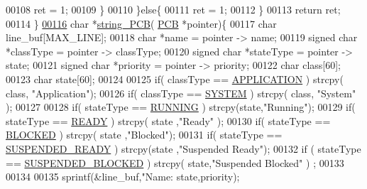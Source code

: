 \begin{DoxyCode}
00108                         ret = 1;
00109                 \}
00110         \}\textcolor{keywordflow}{else}\{
00111                 ret = 1;
00112         \}
00113         \textcolor{keywordflow}{return} ret;
00114 \}
\hypertarget{mpx__r2_8c_source_l00116}{}\hyperlink{mpx__r2_8c_aa1ebf78ebfc66e910acd6efdcf6b2437}{00116} \textcolor{keywordtype}{char} *\hyperlink{mpx__r2_8c_aa1ebf78ebfc66e910acd6efdcf6b2437}{string_PCB}( \hyperlink{structprocess}{PCB} *pointer)\{
00117         \textcolor{keywordtype}{char} line\_buf[MAX\_LINE];
00118         \textcolor{keywordtype}{char} *name = pointer -> name;
00119         \textcolor{keywordtype}{signed} \textcolor{keywordtype}{char} *classType = pointer -> classType;
00120         \textcolor{keywordtype}{signed} \textcolor{keywordtype}{char} *stateType = pointer -> state;
00121         \textcolor{keywordtype}{signed} \textcolor{keywordtype}{char} *priority = pointer -> priority;
00122         \textcolor{keywordtype}{char} \textcolor{keyword}{class}[60];
00123         \textcolor{keywordtype}{char} state[60];
00124         
00125         \textcolor{keywordflow}{if}( classType == \hyperlink{mpx__r2_8h_a796bd7c6ba2e59281760fb155c6287e8}{APPLICATION} ) strcpy( \textcolor{keyword}{class}, \textcolor{stringliteral}{"Application"});
00126         \textcolor{keywordflow}{if}( classType == \hyperlink{mpx__r2_8h_a21b97df85e65556468b28a576311271c}{SYSTEM} ) strcpy( \textcolor{keyword}{class}, \textcolor{stringliteral}{"System"} );
00127         
00128         \textcolor{keywordflow}{if}( stateType == \hyperlink{mpx__r2_8h_a6fb7181d994ee98e735494be55809708}{RUNNING} ) strcpy(state,\textcolor{stringliteral}{"Running"});
00129         \textcolor{keywordflow}{if}( stateType == \hyperlink{mpx__r2_8h_ad1235d5ce36f7267285e82dccd428aa6}{READY} ) strcpy( state ,\textcolor{stringliteral}{"Ready"} );
00130         \textcolor{keywordflow}{if}( stateType == \hyperlink{mpx__r2_8h_a48f6457243719e7031768d4100741159}{BLOCKED} ) strcpy( state ,\textcolor{stringliteral}{"Blocked"});
00131         \textcolor{keywordflow}{if}( stateType == \hyperlink{mpx__r2_8h_a07b1141143e8825b04670da23fca8cc7}{SUSPENDED_READY} ) strcpy(state ,\textcolor{stringliteral}{"Suspended Ready"});
00132         \textcolor{keywordflow}{if} ( stateType == \hyperlink{mpx__r2_8h_a6e41bb5a80c5049e8d364bab8ee4d73a}{SUSPENDED_BLOCKED} ) strcpy( state,\textcolor{stringliteral}{"Suspended Blocked"} )
       ;
00133         
00134         
00135     sprintf(&line\_buf,\textcolor{stringliteral}{"Name: %
       state,priority); 
}
\end{DoxyCode}
